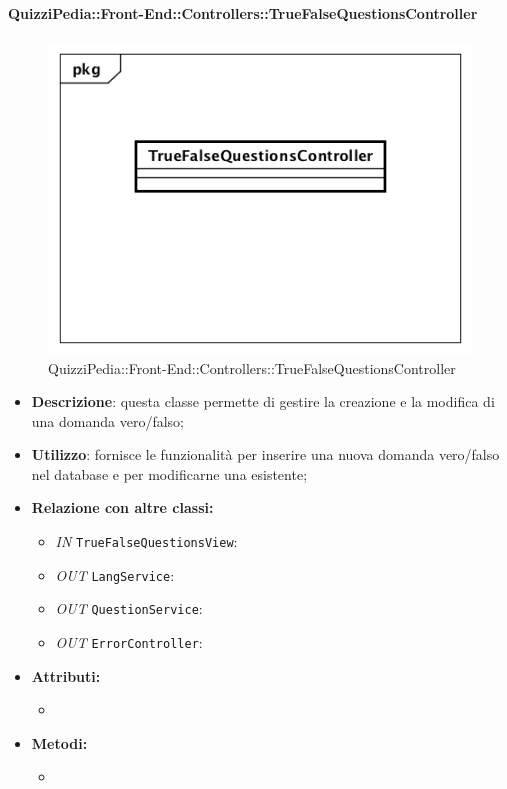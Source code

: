 \paragraph{QuizziPedia::Front-End::Controllers::TrueFalseQuestionsController}
\begin{figure}
	\centering
	\includegraphics[scale=0.45]{UML/Classi/Front-End/QuizziPedia_Front-end_Controller_TrueFalseQuestionsController.png}
	\caption{QuizziPedia::Front-End::Controllers::TrueFalseQuestionsController}
\end{figure}
\begin{itemize}
	\item \textbf{Descrizione}: questa classe permette di gestire la creazione e la modifica di una domanda vero/falso;
	\item \textbf{Utilizzo}: fornisce le funzionalità per inserire una nuova domanda vero/falso nel database e per modificarne una esistente;
	\item \textbf{Relazione con altre classi:}
	\begin{itemize}
		\item \textit{IN} \texttt{TrueFalseQuestionsView}:  
		\item \textit{OUT} \texttt{LangService}: 
		\item \textit{OUT} \texttt{QuestionService}:
		\item \textit{OUT} \texttt{ErrorController}: 
	\end{itemize}
	\item \textbf{Attributi:}
	\begin{itemize}
		\item 
	\end{itemize}
	\item \textbf{Metodi:}
	\begin{itemize}
		\item 
	\end{itemize}
\end{itemize}

